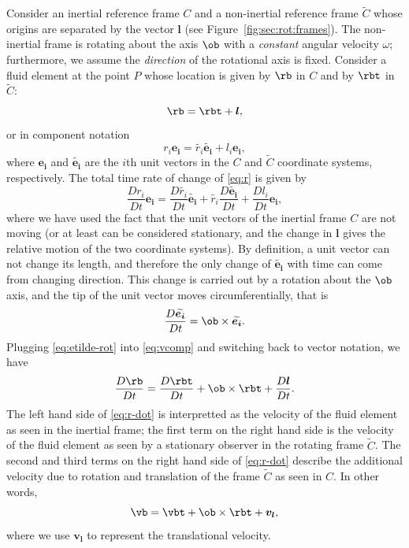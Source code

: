 Consider an inertial reference frame \(C\) and a non-inertial
reference frame \(\widetilde{C}\) whose origins are separated by the
vector \(\boldsymbol{l}\) (see Figure~\ref{fig:sec:rot:frames}).  The non-inertial frame is rotating about the axis
\(\ob\) with a \emph{constant} angular velocity \(\omega\);
furthermore, we assume the \emph{direction} of the rotational axis is
fixed.  Consider a fluid element at the point \(P\) whose location is
given by \(\rb\) in \(C\) and by \(\rbt\) in
\(\widetilde{C}\):
  \begin{equation}
    \rb = \rbt + \boldsymbol{l},
  \end{equation}
or in component notation
  \begin{equation}\label{eq:r}
    r_i\boldsymbol{e_i} = \widetilde{r_i}\widetilde{\boldsymbol{e_i}} + l_i\boldsymbol{e_i},
  \end{equation}
where \(\boldsymbol{e_i}\) and \(\widetilde{\boldsymbol{e_i}}\) are the \(i\)th unit
vectors in the \(C\) and \(\widetilde{C}\) coordinate systems,
respectively.  The total time rate of change of \ref{eq:r} is given by
  \begin{equation}\label{eq:vcomp}
    \frac{Dr_i}{Dt}\boldsymbol{e_i} = \frac{D\widetilde{r_i}}{Dt}\widetilde{\boldsymbol{e_i}} + \widetilde{r_i}\frac{D\widetilde{\boldsymbol{e_i}}}{Dt} + \frac{Dl_i}{Dt}\boldsymbol{e_i},
  \end{equation}
where we have used the fact that the unit vectors of the inertial
frame \(C\) are not moving (or at least can be considered stationary,
and the change in \(\boldsymbol{l}\) gives the relative motion of the two
coordinate systems).  By definition, a unit vector can not change its
length, and therefore the only change of \(\widetilde{\boldsymbol{e_i}}\) with
time can come from changing direction.  This change is carried out by
a rotation about the \(\ob\) axis, and the tip of the unit
vector moves circumferentially, that is
  \begin{equation}\label{eq:etilde-rot}
    \frac{D\widetilde{\boldsymbol{e_i}}}{Dt} = \ob\times\widetilde{\boldsymbol{e_i}}.
  \end{equation}
Plugging \ref{eq:etilde-rot} into \ref{eq:vcomp} and switching back to
vector notation, we have
  \begin{equation}\label{eq:r-dot}
    \frac{D\rb}{Dt} = \frac{D\rbt}{Dt} + \ob\times\rbt + \frac{D\boldsymbol{l}}{Dt}.
  \end{equation}
The left hand side of \ref{eq:r-dot} is interpretted as the velocity
of the fluid element as seen in the inertial frame; the first term on the
right hand side is the velocity of the fluid element as seen by a
stationary observer in the rotating frame \(\widetilde{C}\).  The second
and third terms on the right hand side of \ref{eq:r-dot} describe the
additional velocity due to rotation and translation of the frame
\(\widetilde{C}\) as seen in \(C\).  In other words, 
  \begin{equation}\label{eq:v}
    \vb = \vbt + \ob\times\rbt + \boldsymbol{v_l},
  \end{equation}
where we use \(\boldsymbol{v_l}\) to represent the translational velocity.  

